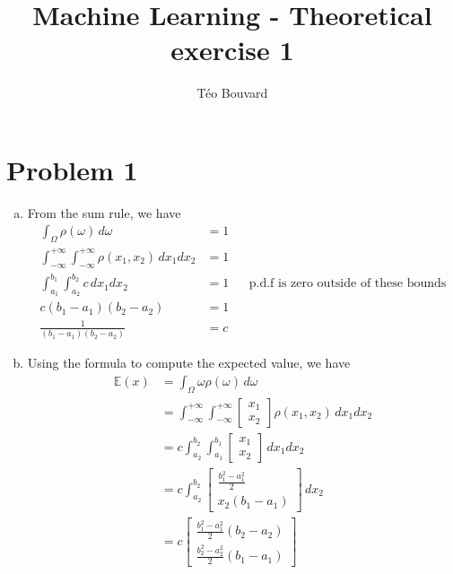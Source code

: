 \documentclass[a4paper, 12pt, twoside]{article}
\begin{document}
\title{Machine Learning - Theoretical exercise 1}
\author{T\'eo Bouvard}
\maketitle

\section{Problem 1}
\begin{enumerate}[a)]
    \item From the sum rule, we have
    \begin{align*}
        \int_\Omega \rho(\omega) \,d\omega &= 1 \\
        \int_{-\infty}^{+\infty}\int_{-\infty}^{+\infty} \rho(x_1, x_2) \,dx_1dx_2 &= 1 \\
        \int_{a_1}^{b_1}\int_{a_2}^{b_2} c \,dx_1dx_2 &= 1 && \text{p.d.f is zero outside of these bounds} \\ 
        c(b_1-a_1)(b_2-a_2) &= 1 \\
        \frac{1}{(b_1-a_1)(b_2-a_2)} &= c
    \end{align*}

    \item Using the formula to compute the expected value, we have
    \begin{align*}
        \mathbb{E}(x) &= \int_\Omega \omega\rho(\omega) \,d\omega \\
        &= \int_{-\infty}^{+\infty}\int_{-\infty}^{+\infty} \begin{bmatrix} x_1 \\ x_2 \end{bmatrix}\rho(x_1, x_2) \,dx_1dx_2 \\
        &= c \int_{a_2}^{b_2}\int_{a_1}^{b_1} \begin{bmatrix} x_1 \\ x_2 \end{bmatrix} \,dx_1dx_2 \\
        &= c \int_{a_2}^{b_2} \begin{bmatrix} \frac{b_1^2 - a_1^2}{2} \\ x_2(b_1-a_1) \end{bmatrix} \,dx_2 \\
        &= c\begin{bmatrix} \frac{b_1^2 - a_1^2}{2}(b_2-a_2) \\ \frac
        {b_2^2 - a_2^2}{2}(b_1-a_1) \end{bmatrix}
    \end{align*}


\end{enumerate}
\end{document}
